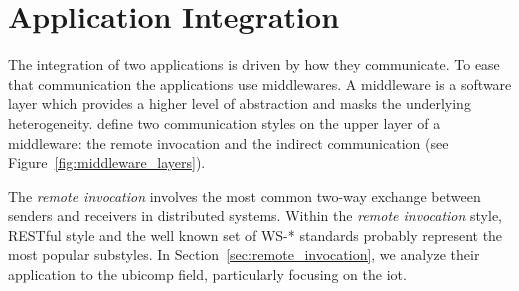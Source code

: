 \section{Application Integration}
\label{sec:integration}

%
%


The integration of two applications is driven by how they communicate.
To ease that communication the applications use middlewares.
A middleware is a software layer which provides a higher level of abstraction and masks the underlying heterogeneity.
\citet{coulouris_distributed_2012} define two communication styles on the upper layer of a middleware: %
the remote invocation and the indirect communication (see Figure~\ref{fig:middleware_layers}).



The \emph{remote invocation} involves the most common two-way exchange between senders and receivers in distributed systems.
Within the \emph{remote invocation} style, RESTful style \citep{fielding_architectural_2000} and the well known set of WS-* \citep{alonso_web_2010} standards probably represent the most popular substyles.
In Section~\ref{sec:remote_invocation}, we analyze their application to the \ac{ubicomp} field, particularly focusing on the \ac{iot}.


\medskip


